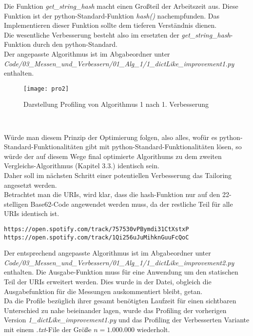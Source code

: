 \documentclass[
10pt, %
a4paper, %
oneside, %
headinclude,footinclude, %
BCOR5mm, %
]{scrartcl}
\begin{document}
Die Funktion \textit{get\_string\_hash} macht einen Großteil der Arbeitszeit aus. Diese Funktion ist der python-Standard-Funktion \textit{hash()} nachempfunden. Das Implementieren dieser Funktion sollte dem tieferen Verständnis dienen.\\
Die wesentliche Verbesserung besteht also im ersetzten der \textit{get\_string\_hash}-Funktion durch den python-Standard.\\
Der angepasste Algorithmus ist im Abgabeordner unter\\ \textit{Code/03\_Messen\_und\_Verbessern/01\_Alg\_1/1\_dictLike\_improvement1.py} enthalten.\\
\begin{figure}[h!]
	\centering 
	\texttt{[image: pro2]} 
	\caption[Darstellung Profiling Alg. 1 nach 1. Verbesserung]{Darstellung Profiling von Algorithmus 1 nach 1. Verbesserung}
\end{figure}\

Würde man diesem Prinzip der Optimierung folgen, also alles, wofür es python-Standard-Funktionalitäten gibt mit python-Standard-Funktionalitäten lösen, so würde der auf diesem Wege final optimierte Algorithums zu dem zweiten Vergleichs-Algorithmus (Kapitel 3.3.) identisch sein.\\
Daher soll im nächsten Schritt einer potentiellen Verbesserung das Tailoring angesetzt werden.\\

Betrachtet man die URIs, wird klar, dass die hash-Funktion nur auf den 22-stelligen Base62-Code angewendet werden muss, da der restliche Teil für alle URIs identisch ist.\\
\begin{lstlisting}
https://open.spotify.com/track/757530vPBymdi31CtXstxP
https://open.spotify.com/track/1Qi256uJuMihknGuuFcQoC
\end{lstlisting}

Der entsprechend angepasste Algorithmus ist im Abgabeordner unter\\ \textit{Code/03\_Messen\_und\_Verbessern/01\_Alg\_1/1\_dictLike\_improvement2.py} enthalten. Die Ausgabe-Funktion muss für eine Anwendung um den statischen Teil der URIs erweitert werden. Dies wurde in der Datei, obgleich die Ausgabefunktion für die Messungen auskommentiert bleibt, getan.\\

Da die Profile bezüglich ihrer gesamt benötigten Laufzeit für einen sichtbaren Unterschied zu nahe beieinander lagen, wurde das Profiling der vorherigen Version \textit{1\_dictLike\_improvement1.py} und das Profiling der Verbesserten Variante mit einem \textit{.txt}-File der Größe \(n=1.000.000\) wiederholt.
\end{document}
